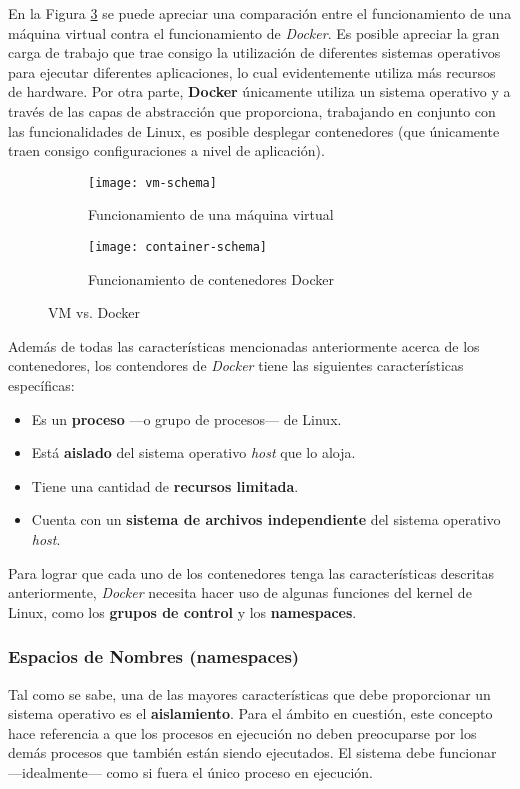 \documentclass[12pt, letterpaper]{article}
\begin{document}
En la Figura \ref{fig:vm-vs-docker} se puede apreciar una comparación entre el 
funcionamiento de una máquina virtual contra el funcionamiento de 
\textit{Docker}. Es posible apreciar la gran carga de trabajo que trae consigo 
la utilización de diferentes sistemas operativos para ejecutar diferentes 
aplicaciones, lo cual evidentemente utiliza más recursos de hardware. Por otra 
parte, \textbf{Docker} únicamente utiliza un sistema operativo y a través de 
las capas de abstracción que proporciona, trabajando en conjunto con las 
funcionalidades de Linux, es posible desplegar contenedores (que únicamente 
traen consigo configuraciones a nivel de aplicación).

\begin{figure}[H]
  \centering
  \begin{subfigure}[b]{0.45\textwidth}
    \centering
    \texttt{[image: vm-schema]}
    \caption{Funcionamiento de una máquina virtual}
    \label{fig:vm-schema}
  \end{subfigure}
  \begin{subfigure}[b]{0.45\textwidth}
    \centering
    \texttt{[image: container-schema]}
    \caption{Funcionamiento de contenedores Docker}
    \label{fig:container-schema}
  \end{subfigure}
  \caption{VM vs. Docker}
  \label{fig:vm-vs-docker}
\end{figure}

Además de todas las características mencionadas anteriormente acerca de los 
contenedores, los contendores de \textit{Docker} tiene las siguientes 
características específicas:
\begin{itemize}
  \item Es un \textbf{proceso} ---o grupo de procesos--- de Linux.
  \item Está \textbf{aislado} del sistema operativo \textit{host} que lo 
  aloja.
  \item Tiene una cantidad de \textbf{recursos limitada}.
  \item Cuenta con un \textbf{sistema de archivos independiente} del sistema 
  operativo \textit{host}.
\end{itemize}

Para lograr que cada uno de los contenedores tenga las características 
descritas anteriormente, \textit{Docker} necesita hacer uso de algunas 
funciones del kernel de Linux, como los \textbf{grupos de control} y los 
\textbf{namespaces}.

\subsubsection{Espacios de Nombres (namespaces)}
Tal como se sabe, una de las mayores características que debe proporcionar un 
sistema operativo es el \textbf{aislamiento}. Para el ámbito en cuestión, este 
concepto hace referencia a que los procesos en ejecución no deben preocuparse 
por los demás procesos que también están siendo ejecutados. El sistema debe 
funcionar ---idealmente--- como si fuera el único proceso en ejecución.
\end{document}
